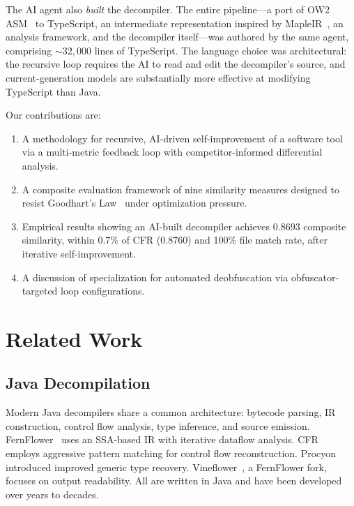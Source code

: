 \documentclass[conference,11pt]{IEEEtran}
\begin{document}
The AI agent also \emph{built} the decompiler. The entire pipeline---a port of OW2 ASM~\cite{asm} to TypeScript, an intermediate representation inspired by MapleIR~\cite{mapleir}, an analysis framework, and the decompiler itself---was authored by the same agent, comprising ${\sim}32{,}000$ lines of TypeScript. The language choice was architectural: the recursive loop requires the AI to read and edit the decompiler's source, and current-generation models are substantially more effective at modifying TypeScript than Java.

Our contributions are:
\begin{enumerate}
    \item A methodology for recursive, AI-driven self-improvement of a software tool via a multi-metric feedback loop with competitor-informed differential analysis.
    \item A composite evaluation framework of nine similarity measures designed to resist Goodhart's Law~\cite{goodhart} under optimization pressure.
    \item Empirical results showing an AI-built decompiler achieves 0.8693 composite similarity, within 0.7\% of CFR (0.8760) and 100\% file match rate, after iterative self-improvement.
    \item A discussion of specialization for automated deobfuscation via obfuscator-targeted loop configurations.
\end{enumerate}

\section{Related Work}
\label{sec:related}

\subsection{Java Decompilation}

Modern Java decompilers share a common architecture: bytecode parsing, IR construction, control flow analysis, type inference, and source emission. FernFlower~\cite{fernflower} uses an SSA-based IR with iterative dataflow analysis. CFR~\cite{cfr} employs aggressive pattern matching for control flow reconstruction. Procyon~\cite{procyon} introduced improved generic type recovery. Vineflower~\cite{vineflower}, a FernFlower fork, focuses on output readability. All are written in Java and have been developed over years to decades.
\end{document}

